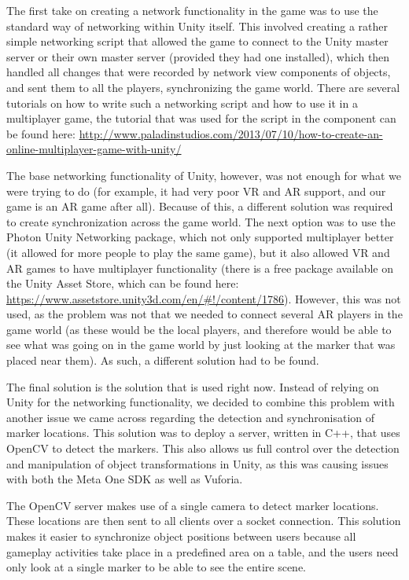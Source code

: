 			The first take on creating a network functionality in the game
			was to use the standard way of networking within Unity itself.
			This involved creating a rather simple networking script that
			allowed the game to connect to the Unity master server or their own
			master server (provided they had one installed), which then handled
			all changes that were recorded by network view components of objects,
			and sent them to all the players, synchronizing the game world.
			There are several tutorials on how to write such a networking
			script and how to use it in a multiplayer game, the tutorial that
			was used for the script in the component can be found here:
			\url{http://www.paladinstudios.com/2013/07/10/how-to-create-an-online-multiplayer-game-with-unity/}
			
			The base networking functionality of Unity, however, was not enough
			for what we were trying to do (for example, it had very poor VR and
			AR support, and our game is an AR game after all). Because of this,
			a different solution was required to create synchronization across
			the game world. The next option was to use the Photon Unity Networking
			package, which not only supported multiplayer better (it allowed for
			more people to play the same game), but it also allowed VR and AR games
			to have multiplayer functionality (there is a free package available
			on the Unity Asset Store, which can be found here: \url{https://www.assetstore.unity3d.com/en/#!/content/1786}). However,
			this was not used, as the problem was not that we needed to connect
			several AR players in the game world (as these would be the local players,
			and therefore would be able to see what was going on in the game world
			by just looking at the marker that was placed near them). As such,
			a different solution had to be found.
			
			The final solution is the solution that is used right now. Instead of 
			relying on Unity for the networking functionality, we decided to 
			combine this problem with another issue we came across regarding 
			the detection and synchronisation of marker locations. This solution
			was to deploy a server, written in C++, that uses OpenCV to detect 
			the markers. This also allows us full control over the detection and 
			manipulation of object transformations in Unity, as this was causing 
			issues with both the Meta One SDK as well as Vuforia.
			
			The OpenCV server makes use of a single camera to detect marker locations.
			These locations are then sent to all clients over a socket connection.
			This solution makes it easier to synchronize object positions between users
			because all gameplay activities take place in a predefined area on a table,
			and the users need only look at a single marker to be able to see the 
			entire scene. 
			
